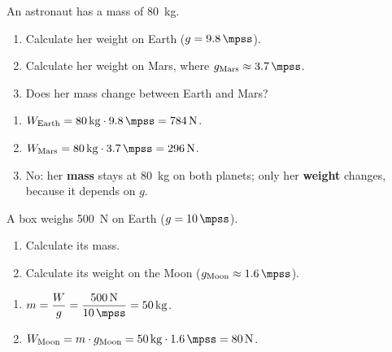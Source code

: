 \begin{exercise}
    An astronaut has a mass of \qty{80}{\kg}.
    \begin{enumerate}[label=\letraminuscula]
        \item Calculate her weight on Earth (\(g=\qty{9.8}{\mpss}\)).
        \item Calculate her weight on Mars, where \(g_{\text{Mars}} \approx \qty{3.7}{\mpss}\).
        \item Does her mass change between Earth and Mars?
    \end{enumerate}
    \begin{solu}
        \begin{enumerate}[label=\alph*)]
            \item \(W_{\text{Earth}} = \qty{80}{\kg} \cdot \qty{9.8}{\mpss} = \qty{784}{\newton}\).
            \item \(W_{\text{Mars}} = \qty{80}{\kg} \cdot \qty{3.7}{\mpss} = \qty{296}{\newton}\).
            \item No: her \textbf{mass} stays at \qty{80}{\kg} on both planets; only her \textbf{weight} changes, because it depends on \(g\).
        \end{enumerate}
    \end{solu}
\end{exercise}

\begin{exercise}
    A box weighs \qty{500}{\newton} on Earth (\(g=\qty{10}{\mpss}\)).
    \begin{enumerate}[label=\letraminuscula]
        \item Calculate its mass.
        \item Calculate its weight on the Moon (\(g_{\text{Moon}} \approx \qty{1.6}{\mpss}\)).
    \end{enumerate}
    \begin{solu}
        \begin{enumerate}[label=\alph*)]
            \item \(m = \dfrac{W}{g} = \dfrac{\qty{500}{\newton}}{\qty{10}{\mpss}} = \qty{50}{\kg}\).
            \item \(W_{\text{Moon}} = m \cdot g_{\text{Moon}} = \qty{50}{\kg} \cdot \qty{1.6}{\mpss} = \qty{80}{\newton}\).
        \end{enumerate}
    \end{solu}
\end{exercise}

